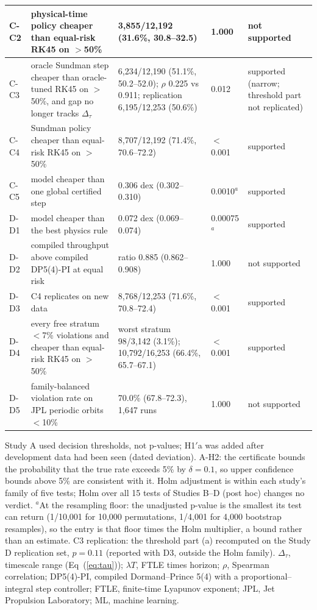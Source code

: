 \documentclass[10pt,letterpaper]{article}
\newlength\savedwidth
\newcommand\thickhline{\noalign{\global\savedwidth\arrayrulewidth\global\arrayrulewidth 2pt}%
\hline
\noalign{\global\arrayrulewidth\savedwidth}}
\begin{document}
\begin{table}[!htbp]
\begin{tabular}{|L{0.55in}|L{1.95in}|L{1.9in}|L{0.5in}|L{0.75in}|}
C-C2 & physical-time policy cheaper than equal-risk RK45 on $>$50\% & 3,855/12,192 (31.6\%, 30.8--32.5) & 1.000 & not supported \\ \hline
C-C3 & oracle Sundman step cheaper than oracle-tuned RK45 on $>$50\%, and gap no longer tracks $\Delta_{\tau}$ & 6,234/12,190 (51.1\%, 50.2--52.0); $\rho$ 0.225 vs 0.911; replication 6,195/12,253 (50.6\%) & 0.012 & supported (narrow; threshold part not replicated) \\ \hline
C-C4 & Sundman policy cheaper than equal-risk RK45 on $>$50\% & 8,707/12,192 (71.4\%, 70.6--72.2) & $<$0.001 & supported \\ \hline
C-C5 & model cheaper than one global certified step & 0.306 dex (0.302--0.310) & 0.0010$^{a}$ & supported \\ \thickhline
D-D1 & model cheaper than the best physics rule & 0.072 dex (0.069--0.074) & 0.00075$^{a}$ & supported \\ \hline
D-D2 & compiled throughput above compiled DP5(4)-PI at equal risk & ratio 0.885 (0.862--0.908) & 1.000 & not supported \\ \hline
D-D3 & C4 replicates on new data & 8,768/12,253 (71.6\%, 70.8--72.4) & $<$0.001 & supported \\ \hline
D-D4 & every free stratum $<$7\% violations and cheaper than equal-risk RK45 on $>$50\% & worst stratum 98/3,142 (3.1\%); 10,792/16,253 (66.4\%, 65.7--67.1) & $<$0.001 & supported \\ \hline
D-D5 & family-balanced violation rate on JPL periodic orbits $<$10\% & 70.0\% (67.8--72.3), 1,647 runs & 1.000 & not supported \\ \hline
\end{tabular}
\begin{flushleft} Study A used decision thresholds, not p-values; H1$'$a was added after development data had been seen (dated deviation). A-H2: the certificate bounds the probability that the true rate exceeds 5\% by $\delta = 0.1$, so upper confidence bounds above 5\% are consistent with it. Holm adjustment is within each study's family of five tests; Holm over all 15 tests of Studies B--D (post hoc) changes no verdict. $^{a}$At the resampling floor: the unadjusted p-value is the smallest its test can return (1/10,001 for 10,000 permutations, 1/4,001 for 4,000 bootstrap resamples), so the entry is that floor times the Holm multiplier, a bound rather than an estimate. C3 replication: the threshold part (a) recomputed on the Study D replication set, $p = 0.11$ (reported with D3, outside the Holm family). $\Delta_{\tau}$, timescale range (Eq~(\ref{eq:tau})); $\lambda T$, FTLE times horizon; $\rho$, Spearman correlation; DP5(4)-PI, compiled Dormand--Prince 5(4) with a proportional--integral step controller; FTLE, finite-time Lyapunov exponent; JPL, Jet Propulsion Laboratory; ML, machine learning.
\end{flushleft}
\label{table2}
\end{table}
\end{document}
